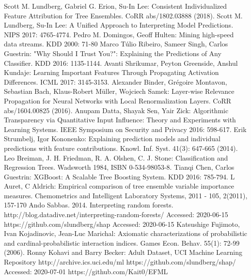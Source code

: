 \documentclass[conference]{IEEEtran}
\begin{document}
\begin{thebibliography}{00}
 Scott M. Lundberg, Gabriel G. Erion, Su-In Lee:
Consistent Individualized Feature Attribution for Tree Ensembles. CoRR abs/1802.03888 (2018).
 Scott M. Lundberg, Su-In Lee: A Unified Approach to Interpreting Model Predictions. NIPS 2017: 4765-4774.
 Pedro M. Domingos, Geoff Hulten: Mining high-speed data streams. KDD 2000: 71-80
 Marco Túlio Ribeiro, Sameer Singh, Carlos Guestrin: "Why Should I Trust You?": Explaining the Predictions of Any Classifier. KDD 2016: 1135-1144.
 Avanti Shrikumar, Peyton Greenside, Anshul Kundaje: Learning Important Features Through Propagating Activation Differences. ICML 2017: 3145-3153.
 Alexander Binder, Grégoire Montavon, Sebastian Bach, Klaus-Robert Müller, Wojciech Samek: Layer-wise Relevance Propagation for Neural Networks with Local Renormalization Layers. CoRR abs/1604.00825 (2016).
Anupam Datta, Shayak Sen, Yair Zick: Algorithmic Transparency via Quantitative Input Influence: Theory and Experiments with Learning Systems. IEEE Symposium on Security and Privacy 2016: 598-617.
Erik Strumbelj, Igor Kononenko: Explaining prediction models and individual predictions with feature contributions. Knowl. Inf. Syst. 41(3): 647-665 (2014).
 Leo Breiman, J. H. Friedman, R. A. Olshen, C. J. Stone: Classification and Regression Trees. Wadsworth 1984, ISBN 0-534-98053-8.
Tianqi Chen, Carlos Guestrin: XGBoost: A Scalable Tree Boosting System. KDD 2016: 785-794.
L Auret, C Aldrich: Empirical comparison of tree ensemble variable importance measures. Chemometrics and Intelligent Laboratory Systems, 2011 - 105, 2(2011), 157-170
Ando Sabbas. 2014. Interpreting random forests. http://blog.datadive.net/interpreting-random-forests/ Accessed: 2020-06-15
https://github.com/slundberg/shap Accessed: 2020-06-15
Katsushige Fujimoto, Ivan Kojadinovic, Jean-Luc Marichal: Axiomatic characterizations of probabilistic and cardinal-probabilistic interaction indices. Games Econ. Behav. 55(1): 72-99 (2006).
Ronny Kohavi and Barry Becker: Adult Dataset, UCI Machine Learning Repository http://archive.ics.uci.edu/ml
 https://github.com/slundberg/shap/ Accessed: 2020-07-01
 https://github.com/Kait0/EFML

\end{thebibliography}
\end{document}
